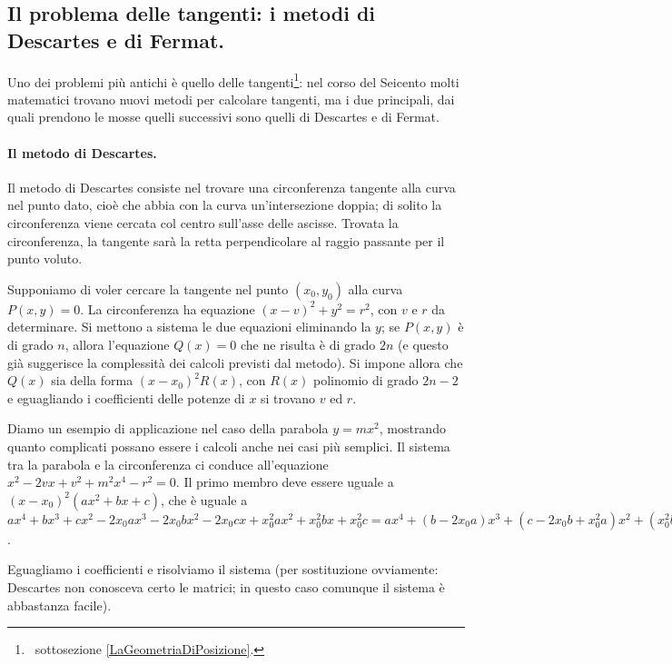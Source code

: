 \subsection{Il problema delle tangenti: i metodi di Descartes e di Fermat.}\label{IMetodiDiDescartesEDiFermat}
\par Uno dei problemi pi\`u antichi \`e quello delle tangenti\footnote{\CFR\ sottosezione \ref{LaGeometriaDiPosizione}.}: nel corso del Seicento molti matematici trovano nuovi metodi per calcolare tangenti, ma i due principali, dai quali prendono le mosse quelli successivi sono quelli di Descartes e di Fermat.
\paragraph{Il metodo di Descartes.} Il metodo di Descartes consiste nel trovare una circonferenza tangente alla curva nel punto dato, cio\`e che abbia con la curva un'intersezione doppia; di solito la circonferenza viene cercata col centro sull'asse delle ascisse. Trovata la circonferenza, la tangente sar\`a la retta perpendicolare al raggio passante per il punto voluto.
\par Supponiamo di voler cercare la tangente nel punto $(x_0,y_0)$ alla curva $P(x,y) = 0$. La circonferenza ha equazione $(x - v)^2 + y^2 = r^2$, con $v$ e $r$ da determinare. Si mettono a sistema le due equazioni eliminando la $y$; se $P(x,y)$ \`e di grado $n$, allora l'equazione $Q(x) = 0$ che ne risulta \`e di grado $2n$ (e questo gi\`a suggerisce la complessit\`a dei calcoli previsti dal metodo). Si impone allora che $Q(x)$ sia della forma $(x - x_0)^2 R(x)$, con $R(x)$ polinomio di grado $2n - 2$ e eguagliando i coefficienti delle potenze di $x$ si trovano $v$ ed $r$.
\par Diamo un esempio di applicazione nel caso della parabola $y = mx^2$, mostrando quanto complicati possano essere i calcoli anche nei casi pi\`u semplici. Il sistema tra la parabola e la circonferenza ci conduce all'equazione $x^2 - 2vx + v^2 + m^2x^4 - r^2 = 0$. Il primo membro deve essere uguale a $(x - x_0)^2(ax^2 + bx + c)$, che \`e uguale a $ax^4 + bx^3 + cx^2 - 2x_0ax^3 - 2x_0bx^2 -2x_0cx + x_0^2ax^2 + x_0^2bx + x_0^2c = ax^4 + (b - 2x_0a)x^3 + (c - 2x_0b + x_0^2a)x^2 + (x_0^2b - 2x_0c)x + x_0^2c$.
\par Eguagliamo i coefficienti e risolviamo il sistema (per sostituzione ovviamente: Descartes non conosceva certo le matrici; in questo caso comunque il sistema \`e abbastanza facile).

